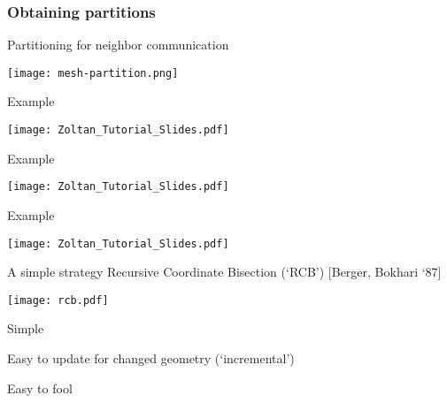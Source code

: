 \documentclass[english,compress]{beamer}
\begin{document}
\subsubsection{Obtaining partitions}
\begin{frame}{Partitioning for neighbor communication}
  \begin{center}
    \texttt{[image: mesh-partition.png]}
  \end{center}
\end{frame}
\begin{frame}{Example}
  \begin{center}
    \texttt{[image: Zoltan\_Tutorial\_Slides.pdf]}
  \end{center}
\end{frame}
\begin{frame}{Example}
  \begin{center}
  \texttt{[image: Zoltan\_Tutorial\_Slides.pdf]}
  \end{center}
\end{frame}
\begin{frame}{Example}
  \begin{center}
\texttt{[image: Zoltan\_Tutorial\_Slides.pdf]}
  \end{center}
\end{frame}
\begin{frame}{A simple strategy}
  Recursive Coordinate Bisection (`RCB')
  [Berger, Bokhari `87]

  \begin{center}
    \texttt{[image: rcb.pdf]}
  \end{center}

  \vspace{-1cm}
  \plusball Simple

  \plusball Easy to update for changed geometry (`incremental')

  \minusball Easy to fool

\end{frame}
\end{document}
